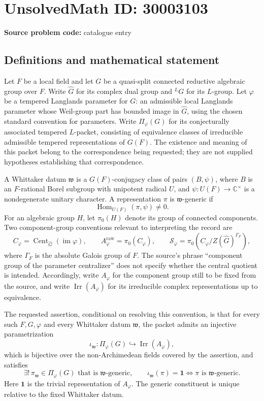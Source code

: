 \documentclass[11pt]{article}
\newcommand{\C}{\mathbb{C}}
\begin{document}
\section*{UnsolvedMath ID: 30003103}
\textbf{Source problem code:} catalogue entry
\subsection{Definitions and mathematical statement}
Let \(F\) be a local field and let \(G\) be a quasi-split connected reductive algebraic group over \(F\). Write \(\widehat G\) for its complex dual group and \({}^{L}G\) for its \(L\)-group. Let \(\varphi\) be a tempered Langlands parameter for \(G\): an admissible local Langlands parameter whose Weil-group part has bounded image in \(\widehat G\), using the chosen standard convention for parameters. Write \(\Pi_\varphi(G)\) for its conjecturally associated tempered \(L\)-packet, consisting of equivalence classes of irreducible admissible tempered representations of \(G(F)\). The existence and meaning of this packet belong to the correspondence being requested; they are not supplied hypotheses establishing that correspondence.

A Whittaker datum \(\mathfrak w\) is a \(G(F)\)-conjugacy class of pairs \((B,\psi)\), where \(B\) is an \(F\)-rational Borel subgroup with unipotent radical \(U\), and \(\psi:U(F)\to\C^\times\) is a nondegenerate unitary character. A representation \(\pi\) is \(\mathfrak w\)-generic if
\[
\operatorname{Hom}_{U(F)}(\pi,\psi)\ne 0.
\]
For an algebraic group \(H\), let \(\pi_0(H)\) denote its group of connected components. Two component-group conventions relevant to interpreting the record are
\[
C_\varphi=\operatorname{Cent}_{\widehat G}(\operatorname{im}\varphi),\qquad
A_\varphi^{\mathrm{raw}}=\pi_0(C_\varphi),\qquad
\mathcal S_\varphi=\pi_0\!\left(C_\varphi/Z(\widehat G)^{\Gamma_F}\right),
\]
where \(\Gamma_F\) is the absolute Galois group of \(F\). The source's phrase ``component group of the parameter centralizer'' does not specify whether the central quotient is intended. Accordingly, write \(A_\varphi\) for the component group still to be fixed from the source, and write \(\operatorname{Irr}(A_\varphi)\) for its irreducible complex representations up to equivalence.

The requested assertion, conditional on resolving this convention, is that for every such \(F,G,\varphi\) and every Whittaker datum \(\mathfrak w\), the packet admits an injective parametrization
\[
\iota_{\mathfrak w}:\Pi_\varphi(G)\hookrightarrow\operatorname{Irr}(A_\varphi),
\]
which is bijective over the non-Archimedean fields covered by the assertion, and satisfies
\[
\exists!\,\pi_{\mathfrak w}\in\Pi_\varphi(G)\text{ that is }\mathfrak w\text{-generic},
\qquad
\iota_{\mathfrak w}(\pi)=\mathbf 1
\Longleftrightarrow
\pi\text{ is }\mathfrak w\text{-generic}.
\]
Here \(\mathbf 1\) is the trivial representation of \(A_\varphi\). The generic constituent is unique relative to the fixed Whittaker datum.
\end{document}

